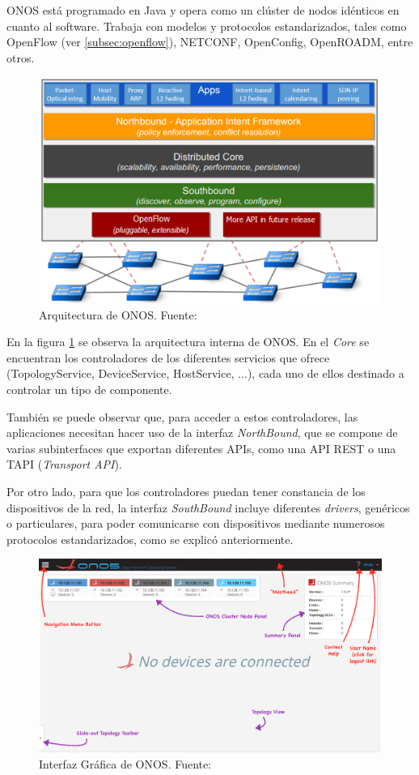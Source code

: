 ONOS está programado en Java y opera como un clúster de nodos idénticos en cuanto al software. Trabaja con modelos y protocolos estandarizados, tales como OpenFlow (ver \ref{subsec:openflow}), NETCONF, OpenConfig, OpenROADM, entre otros.

\clearpage


\begin{figure}[!ht]
	\centering
	\includegraphics[width=0.7\linewidth]{imagenes/onos_architecture}
	\caption{Arquitectura de ONOS. 
		Fuente: \cite{arqonosbib}}
	\label{fig:onosarch}
\end{figure}

En la figura \ref{fig:onosarch} se observa la arquitectura interna de ONOS. En el \textit{Core} se encuentran los controladores de los diferentes servicios que ofrece (TopologyService, DeviceService, HostService, ...), cada uno de ellos destinado a controlar un tipo de componente.

También se puede observar que, para acceder a estos controladores, las aplicaciones necesitan hacer uso de la interfaz \textit{NorthBound}, que se compone de varias subinterfaces que exportan diferentes APIs, como una API REST o una TAPI (\textit{Transport API}).

Por otro lado, para que los controladores puedan tener constancia de los dispositivos de la red, la interfaz \textit{SouthBound} incluye diferentes \textit{drivers}, genéricos o particulares, para poder comunicarse con dispositivos mediante numerosos protocolos estandarizados, como se explicó anteriormente.

\begin{figure}[!ht]
	\centering
	\includegraphics[width=0.8\linewidth]{imagenes/onos_gui}
	\caption{Interfaz Gráfica de ONOS. 
		Fuente: \cite{wikionosbib}}
	\label{fig:onosgui}
\end{figure}

